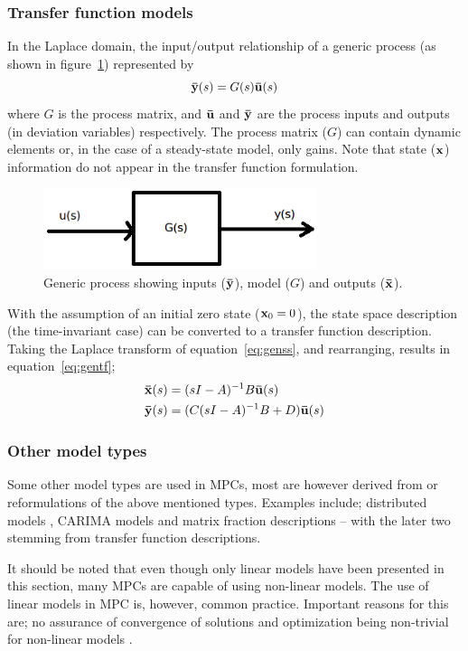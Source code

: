 \subsubsection{Transfer function models}
In the Laplace domain, the input/output relationship of a generic process (as shown in figure~\ref{fig:genmodel}) represented by
\begin{equation*}
  {\bf {\bar y}}(s)=G(s){\bf {\bar u}}(s)
\end{equation*}
where $G$ is the process matrix, and ${\bf {\bar u}}$ and ${\bf {\bar y}}$ are the process inputs and outputs (in deviation variables) respectively.
The process matrix ($G$) can contain dynamic elements or, in the case of a steady-state model, only gains.
Note that state (${\bf {x}}$) information do not appear in the transfer function formulation.
\begin{figure}[htbp]
  \centering
  \includegraphics[width=8cm]{graph/model_genprocess}
  \caption[Generic input/output model]{Generic process showing inputs (${\bf {\bar y}}$), model ($G$) and outputs (${\bf {\bar x}}$).}
  \label{fig:genmodel}
\end{figure}
With the assumption of an initial zero state (${\bf {x}}_0=0$), the state space description (the time-invariant case) can be converted to a transfer function description.
Taking the Laplace transform of equation~\ref{eq:genss}, and rearranging, results in equation~\ref{eq:gentf};
\begin{align}
  \label{eq:gentf}
    {\bf {\bar x}}(s) &= (sI-A)^{-1}B{\bf {\bar u}}(s) \\
    {\bf {\bar y}}(s) &= (C(sI-A)^{-1}B+D){\bf {\bar u}}(s) \notag
\end{align} 
\subsubsection{Other model types}
Some other model types are used in MPCs, most are however derived from or reformulations of the above mentioned types.
Examples include; distributed models \citep[4]{rawlings}, CARIMA models and matrix fraction descriptions \citep[24,28]{rossiter} -- with the later two stemming from transfer function descriptions.

It should be noted that even though only linear models have been presented in this section, many MPCs are capable of using non-linear models.
The use of linear models in MPC is, however, common practice.
Important reasons for this are; no assurance of convergence of solutions and optimization being non-trivial for non-linear models \citep[17]{rossiter}.


